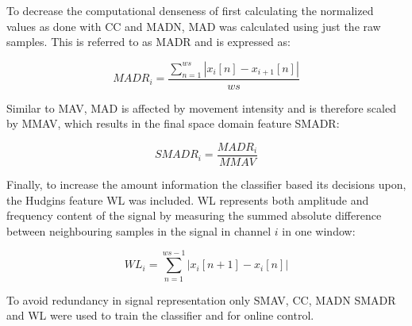 To decrease the computational denseness of first calculating the normalized values as done with CC and MADN, MAD was calculated using just the raw samples. This is referred to as MADR and is expressed as:

\begin{equation} \label{eq:MADR}
MADR_i=\frac{\sum\limits_{n=1}^{ws}|x_i[n]-x_{i+1}[n]|}{ws}
\end{equation}

Similar to MAV, MAD is affected by movement intensity and is therefore scaled by MMAV, which results in the final space domain feature SMADR: 

\begin{equation} \label{eq:SMADR}
SMADR_i=\frac{MADR_i}{MMAV}
\end{equation}

Finally, to increase the amount information the classifier based its decisions upon, the Hudgins feature WL was included. WL represents both amplitude and frequency content of the signal by measuring the summed absolute difference between neighbouring samples in the signal in channel $i$ in one window: 

\begin{equation} \label{eq:WL}
WL_i=\sum\limits_{n=1}^{ws-1}|x_{i}[n+1]-x_i[n]|
\end{equation}

To avoid redundancy in signal representation only SMAV, CC, MADN SMADR and WL were used to train the classifier and for online control. 
